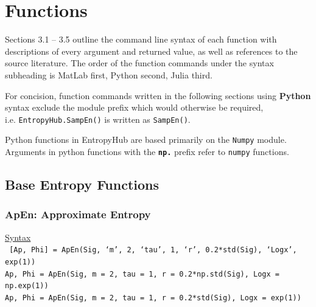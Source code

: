 \documentclass[12pt, a4paper, titlepage, openany]{book}
\newcommand\chapterimage[2][]{%
  \AddToShipoutPictureBG*{%
    \AtTextUpperLeft{%
     \hspace*{\textwidth}%
      \llap{%
            \texttt{[image: \#2]}}}}}%
\begin{document}
\newpage
\chapter{\textbf{Functions}}
\chapterimage[width=16cm, height=3cm]{Chapter Banner2.png}
\vspace{55mm}

Sections 3.1 – 3.5 outline the command line syntax of each function with descriptions of every argument and returned value, as well as references to the source literature. The order of the function commands under the syntax subheading is MatLab first, Python second, Julia third. 

\begin{tcolorbox}[sharp corners, colback=ehone!30, colframe=ehone, title=\textbf{NOTE}]
For concision, function commands written in the following sections using \textbf{Python} syntax exclude the module prefix which would otherwise be required,\\ i.e. \texttt{EntropyHub.SampEn()} is written as \texttt{SampEn()}. 
\end{tcolorbox}

\begin{tcolorbox}[sharp corners, colback=ehone!30, colframe=ehone, title=\textbf{NOTE}]
Python functions in EntropyHub are based primarily on the \texttt{Numpy} module.\\ Arguments in python functions with the \textbf{\texttt{np.}} prefix refer to \texttt{numpy} functions.  
\end{tcolorbox}


\setlength{\parskip}{2em}

\newpage
\section{Base Entropy Functions}
\vspace{1cm}
\subsection{\normalsize ApEn: \hspace{15mm} Approximate Entropy}
\noindent\ul{Syntax} \vspace{6mm} \\ \noindent \texttt{\footnotesize
[Ap, Phi] = ApEn(Sig, ‘m’, 2, ‘tau’, 1, ‘r’, 0.2*std(Sig), ‘Logx’, exp(1))\\
 Ap, Phi  = ApEn(Sig, m = 2, tau = 1, r = 0.2*np.std(Sig), Logx = np.exp(1))\\
 Ap, Phi  = ApEn(Sig, m = 2, tau = 1, r = 0.2*std(Sig), Logx = exp(1))}
\end{document}

